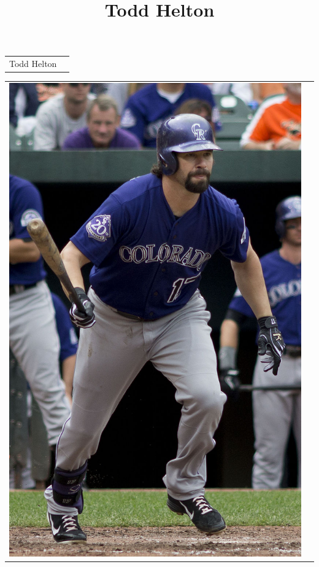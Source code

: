 \documentclass[a4paper,12pt]{article}
\title{Todd Helton}
\author{}
\begin{document}
\maketitle
\centering
\begin{tabular}{||lr||}
\hline
Todd Helton&\\
\end{tabular}

\begin{tabular}{lr}
\includegraphics[scale=0.15]{ziomek.jpg}&\\
\end{tabular}
\end{document}
